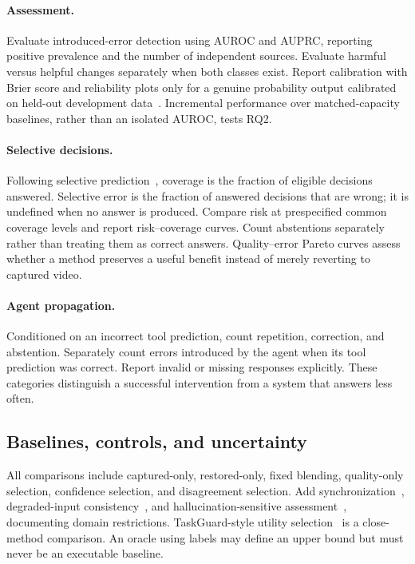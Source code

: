 \paragraph{Assessment.} Evaluate introduced-error detection using AUROC and AUPRC, reporting positive prevalence and the number of independent sources. Evaluate harmful versus helpful changes separately when both classes exist. Report calibration with Brier score and reliability plots only for a genuine probability output calibrated on held-out development data~\cite{calibration}. Incremental performance over matched-capacity baselines, rather than an isolated AUROC, tests RQ2.

\paragraph{Selective decisions.} Following selective prediction~\cite{selective}, coverage is the fraction of eligible decisions answered. Selective error is the fraction of answered decisions that are wrong; it is undefined when no answer is produced. Compare risk at prespecified common coverage levels and report risk--coverage curves. Count abstentions separately rather than treating them as correct answers. Quality--error Pareto curves assess whether a method preserves a useful benefit instead of merely reverting to captured video.

\paragraph{Agent propagation.} Conditioned on an incorrect tool prediction, count repetition, correction, and abstention. Separately count errors introduced by the agent when its tool prediction was correct. Report invalid or missing responses explicitly. These categories distinguish a successful intervention from a system that answers less often.

\subsection{Baselines, controls, and uncertainty}
All comparisons include captured-only, restored-only, fixed blending, quality-only selection, confidence selection, and disagreement selection. Add synchronization~\cite{syncnet}, degraded-input consistency~\cite{cdi}, and hallucination-sensitive assessment~\cite{hs,hallugen}, documenting domain restrictions. TaskGuard-style utility selection~\cite{taskguard} is a close-method comparison. An oracle using labels may define an upper bound but must never be an executable baseline.

